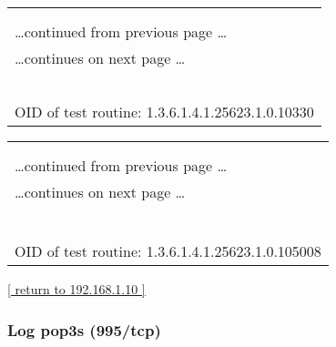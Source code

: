 \documentclass{article}
\begin{document}
\begin{longtable}{|p{}|}
\hline
\rowcolor{openvas_log}{\color{white}{Log (CVSS: 0.0) }}\\
\rowcolor{openvas_log}{\color{white}{NVT: Services}}\\
\hline
\endfirsthead
\hfill\ldots continued from previous page \ldots \\
\hline
\endhead
\hline
\ldots continues on next page \ldots \\
\endfoot
\hline
\endlastfoot
\\
\rowcolor{white}{\verb=A pop3 server is running on this port=}\\
\rowcolor{white}{\verb==}\\
\rowcolor{white}{\verb==}\\
\\
OID of test routine: 1.3.6.1.4.1.25623.1.0.10330\\
\end{longtable}

\begin{longtable}{|p{}|}
\hline
\rowcolor{openvas_log}{\color{white}{Log (CVSS: 0.0) }}\\
\rowcolor{openvas_log}{\color{white}{NVT: POP3 STARTTLS Detection}}\\
\hline
\endfirsthead
\hfill\ldots continued from previous page \ldots \\
\hline
\endhead
\hline
\ldots continues on next page \ldots \\
\endfoot
\hline
\endlastfoot
\\
\rowcolor{white}{\verb= Summary:=}\\
\rowcolor{white}{\verb= The remote POP3 Server supports the STARTTLS command.=}\\
\rowcolor{white}{\verb==}\\
\rowcolor{white}{\verb==}\\
\\
OID of test routine: 1.3.6.1.4.1.25623.1.0.105008\\
\end{longtable}

\begin{footnotesize}\hyperref[host:192.168.1.10]{[ return to 192.168.1.10 ]}\end{footnotesize}
\subsubsection{Log pop3s (995/tcp)}
\label{port:192.168.1.10 pop3s (995/tcp) Log}
\end{document}
